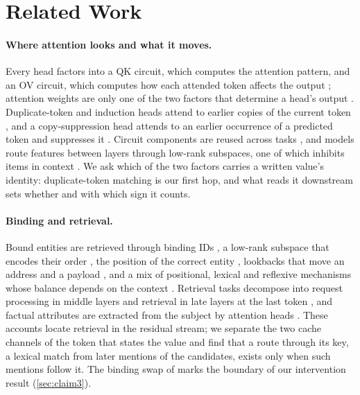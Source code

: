 \section{Related Work}\label{sec:related}

\paragraph{Where attention looks and what it moves.}
Every head factors into a QK circuit, which computes the attention pattern, and an OV circuit, which computes how each attended token affects the output \citep{elhage2021framework}; attention weights are only one of the two factors that determine a head's output \citep{kobayashi2020norm}.
Duplicate-token and induction heads attend to earlier copies of the current token \citep{wang2022ioi,olsson2022context}, and a copy-suppression head attends to an earlier occurrence of a predicted token and suppresses it \citep{mcdougall2023copy}.
Circuit components are reused across tasks \citep{merullo2024reuse}, and models route features between layers through low-rank subspaces, one of which inhibits items in context \citep{merullo2024talking}.
We ask which of the two factors carries a written value's identity: duplicate-token matching is our first hop, and what reads it downstream sets whether and with which sign it counts.

\paragraph{Binding and retrieval.}
Bound entities are retrieved through binding IDs \citep{feng2023binding}, a low-rank subspace that encodes their order \citep{dai2024binding}, the position of the correct entity \citep{prakash2024finetuning}, lookbacks that move an address and a payload \citep{prakash2025lookbacks}, and a mix of positional, lexical and reflexive mechanisms whose balance depends on the context \citep{gurarieh2025mixing}.
Retrieval tasks decompose into request processing in middle layers and retrieval in late layers at the last token \citep{variengien2023leap}, and factual attributes are extracted from the subject by attention heads \citep{geva2023dissecting}.
These accounts locate retrieval in the residual stream; we separate the two cache channels of the token that states the value and find that a route through its key, a lexical match from later mentions of the candidates, exists only when such mentions follow it.
The binding swap of \citet{prakash2025lookbacks} marks the boundary of our intervention result (\cref{sec:claim3}).

